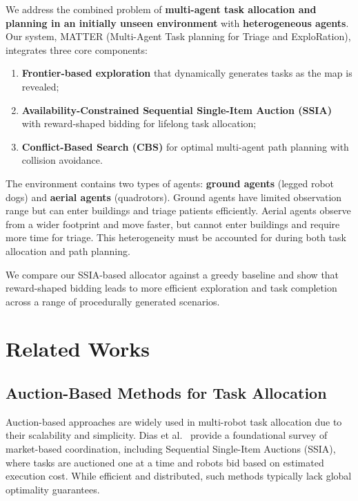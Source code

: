 \documentclass[conference]{IEEEtran}
\begin{document}
We address the combined problem of \textbf{multi-agent task allocation and planning in an initially unseen environment} with \textbf{heterogeneous agents}. Our system, MATTER (Multi-Agent Task planning for Triage and ExploRation), integrates three core components:
\begin{enumerate}
    \item \textbf{Frontier-based exploration} that dynamically generates tasks as the map is revealed;
    \item \textbf{Availability-Constrained Sequential Single-Item Auction (SSIA)} with reward-shaped bidding for lifelong task allocation;
    \item \textbf{Conflict-Based Search (CBS)} for optimal multi-agent path planning with collision avoidance.
\end{enumerate}

The environment contains two types of agents: \textbf{ground agents} (legged robot dogs) and \textbf{aerial agents} (quadrotors). Ground agents have limited observation range but can enter buildings and triage patients efficiently. Aerial agents observe from a wider footprint and move faster, but cannot enter buildings and require more time for triage. This heterogeneity must be accounted for during both task allocation and path planning.

We compare our SSIA-based allocator against a greedy baseline and show that reward-shaped bidding leads to more efficient exploration and task completion across a range of procedurally generated scenarios.

\section{Related Works}

\subsection{Auction-Based Methods for Task Allocation}

Auction-based approaches are widely used in multi-robot task allocation due to their scalability and simplicity. Dias et al.~\cite{dias2006market} provide a foundational survey of market-based coordination, including Sequential Single-Item Auctions (SSIA), where tasks are auctioned one at a time and robots bid based on estimated execution cost. While efficient and distributed, such methods typically lack global optimality guarantees.
\end{document}
